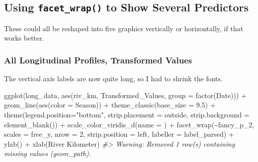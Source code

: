 \documentclass[
]{article}
\newenvironment{Shaded}{\begin{snugshade}}{\end{snugshade}}
\newcommand{\AttributeTok}[1]{\textcolor[rgb]{0.77,0.63,0.00}{#1}}
\newcommand{\CommentTok}[1]{\textcolor[rgb]{0.56,0.35,0.01}{\textit{#1}}}
\newcommand{\DecValTok}[1]{\textcolor[rgb]{0.00,0.00,0.81}{#1}}
\newcommand{\FloatTok}[1]{\textcolor[rgb]{0.00,0.00,0.81}{#1}}
\newcommand{\FunctionTok}[1]{\textcolor[rgb]{0.00,0.00,0.00}{#1}}
\newcommand{\NormalTok}[1]{#1}
\newcommand{\SpecialCharTok}[1]{\textcolor[rgb]{0.00,0.00,0.00}{#1}}
\newcommand{\StringTok}[1]{\textcolor[rgb]{0.31,0.60,0.02}{#1}}
\begin{document}
\hypertarget{using-facet_wrap-to-show-several-predictors}{%
\subsection{\texorpdfstring{Using \texttt{facet\_wrap()} to Show Several
Predictors}{Using facet\_wrap() to Show Several Predictors}}\label{using-facet_wrap-to-show-several-predictors}}

These could all be reshaped into five graphics vertically or
horizontally, if that works better.

\hypertarget{all-longitudinal-profiles-transformed-values}{%
\subsubsection{All Longitudinal Profiles, Transformed
Values}\label{all-longitudinal-profiles-transformed-values}}

The vertical axis labels are now quite long, so I had to shrink the
fonts.

\begin{Shaded}
\begin{Highlighting}[]
\FunctionTok{ggplot}\NormalTok{(long\_data, }\FunctionTok{aes}\NormalTok{(riv\_km, Transformed\_Values, }\AttributeTok{group =} \FunctionTok{factor}\NormalTok{(Date))) }\SpecialCharTok{+}
  \FunctionTok{geom\_line}\NormalTok{(}\FunctionTok{aes}\NormalTok{(}\AttributeTok{color =}\NormalTok{ Season)) }\SpecialCharTok{+}
  \FunctionTok{theme\_classic}\NormalTok{(}\AttributeTok{base\_size =} \FloatTok{9.5}\NormalTok{) }\SpecialCharTok{+}
  \FunctionTok{theme}\NormalTok{(}\AttributeTok{legend.position=}\StringTok{"bottom"}\NormalTok{,}
        \AttributeTok{strip.placement =} \StringTok{\textquotesingle{}outside\textquotesingle{}}\NormalTok{,}
        \AttributeTok{strip.background =} \FunctionTok{element\_blank}\NormalTok{()) }\SpecialCharTok{+}
  \FunctionTok{scale\_color\_viridis\_d}\NormalTok{(}\AttributeTok{name =} \StringTok{\textquotesingle{}\textquotesingle{}}\NormalTok{) }\SpecialCharTok{+}
  \FunctionTok{facet\_wrap}\NormalTok{(}\SpecialCharTok{\textasciitilde{}}\NormalTok{fancy\_p\_2, }
             \AttributeTok{scales =} \StringTok{\textquotesingle{}free\_y\textquotesingle{}}\NormalTok{, }
             \AttributeTok{nrow =} \DecValTok{2}\NormalTok{,}
             \AttributeTok{strip.position =} \StringTok{\textquotesingle{}left\textquotesingle{}}\NormalTok{,}
             \AttributeTok{labeller =}\NormalTok{ label\_parsed) }\SpecialCharTok{+}
  \FunctionTok{ylab}\NormalTok{(}\StringTok{\textquotesingle{}\textquotesingle{}}\NormalTok{) }\SpecialCharTok{+}
  \FunctionTok{xlab}\NormalTok{(}\StringTok{\textquotesingle{}River Kilometer\textquotesingle{}}\NormalTok{)}
\CommentTok{\#\textgreater{} Warning: Removed 1 row(s) containing missing values (geom\_path).}
\end{Highlighting}
\end{Shaded}
\end{document}
